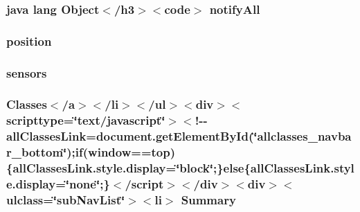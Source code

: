 \hypertarget{_sensors_list_adapter_8html_a1279357e6e09e33e75b55eb05fdb6436}{
\subsubsection[{notify\-All}]{\setlength{\rightskip}{0pt plus 5cm}java lang Object$<$/h3$>$$<$code$>$ notify\-All}}\label{_sensors_list_adapter_8html_a1279357e6e09e33e75b55eb05fdb6436}
\hypertarget{_sensors_list_adapter_8html_a7130b1618285588513fd1ff97884b9d9}{
\subsubsection[{position}]{\setlength{\rightskip}{0pt plus 5cm}position}}\label{_sensors_list_adapter_8html_a7130b1618285588513fd1ff97884b9d9}
\hypertarget{_sensors_list_adapter_8html_a3c0768978d53dd45f891f0826f3d83bd}{
\subsubsection[{sensors}]{\setlength{\rightskip}{0pt plus 5cm}sensors}}\label{_sensors_list_adapter_8html_a3c0768978d53dd45f891f0826f3d83bd}
\hypertarget{_sensors_list_adapter_8html_a6f9ab45abc9b0679dc1b132fbacfc681}{
\subsubsection[{Summary}]{\setlength{\rightskip}{0pt plus 5cm}Classes$<$/{\bf a}$>$$<$/li$>$$<$/ul$>$$<$div$>$$<$scripttype=\char`\"{}text/javascript\char`\"{}$>$$<$!-\/-\/all\-Classes\-Link=document.\-get\-Element\-By\-Id(\char`\"{}allclasses\-\_\-navbar\-\_\-bottom\char`\"{});if(window==top)\{all\-Classes\-Link.\-style.\-display=\char`\"{}block\char`\"{};\}else\{all\-Classes\-Link.\-style.\-display=\char`\"{}none\char`\"{};\}$<$/script$>$$<$/div$>$$<$div$>$$<$ulclass=\char`\"{}sub\-Nav\-List\char`\"{}$>$$<$li$>$ Summary}}\label{_sensors_list_adapter_8html_a6f9ab45abc9b0679dc1b132fbacfc681}
